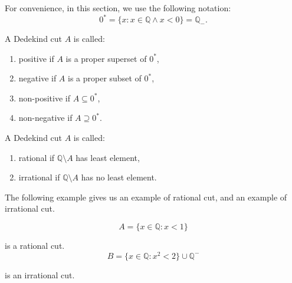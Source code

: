 \par For convenience, in this section, we use the following notation:
\[
    {0}^{*} = \{ x : x\in\mathbb{Q} \wedge x < 0 \} = {\mathbb{Q}}_{-}.
\]

\begin{definition}
    A Dedekind cut $A$ is called:
    \begin{enumerate}[label = (\roman*)]
        \item positive if $A$ is a proper superset of ${0}^{*}$,
        \item negative if $A$ is a proper subset of ${0}^{*}$,
        \item non-positive if $A\subseteq {0}^{*}$,
        \item non-negative if $A\supseteq {0}^{*}$.
    \end{enumerate}
\end{definition}

\begin{definition}
    A Dedekind cut $ A$ is called:
    \begin{enumerate}[label = (\roman*)]
        \item rational if $\mathbb{Q}\setminus A$ has least element,
        \item irrational if $\mathbb{Q}\setminus A$ has no least element.
    \end{enumerate}
\end{definition}

\par The following example gives us an example of rational cut, and an example of irrational cut.

\begin{example}
    \[
        A = \{ x\in\mathbb{Q}: x < 1 \}
    \]
    \par is a rational cut.
    \[
        B = \{ x\in\mathbb{Q}: {x}^{2} < 2 \} \cup \mathbb{Q}^{-}
    \]
    \par is an irrational cut.
\end{example}

